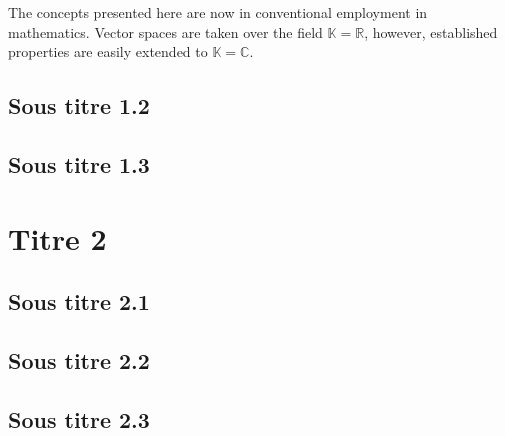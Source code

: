 \documentclass[10pt,fleqn]{article} %
\begin{document}
\begin{vocabulary}
The concepts presented here are now in conventional employment in mathematics. Vector spaces are taken over the field $\mathbb{K}=\mathbb{R}$, however, established properties are easily extended to $\mathbb{K}=\mathbb{C}$.
\end{vocabulary}

\subsection{Sous titre 1.2}
\lipsum[1-2]
\subsection{Sous titre 1.3}
\lipsum[1-2]
\section{Titre 2}
\subsection{Sous titre 2.1}
\subsection{Sous titre 2.2}
\subsection{Sous titre 2.3}
\end{document}
